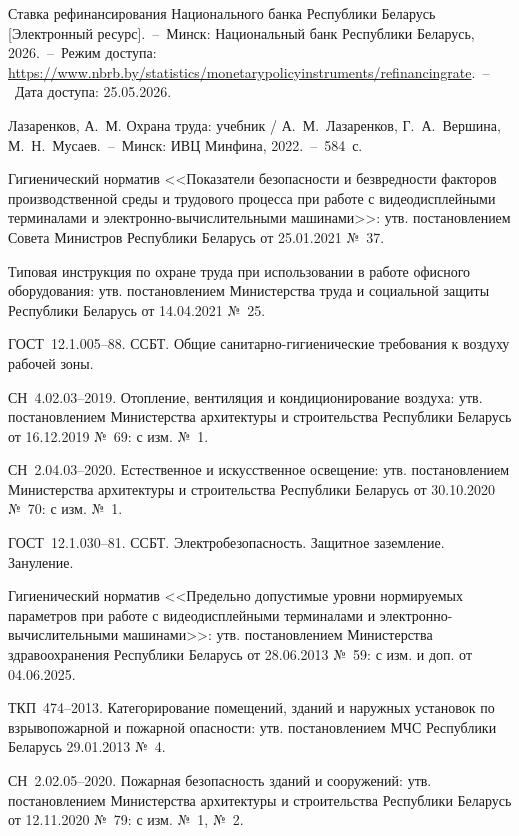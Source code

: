 \begin{enumerate}[label=\arabic*, wide=0pt, labelsep=1ex, nosep]
 Ставка рефинансирования Национального банка Республики Беларусь [Электронный ресурс].~--~Минск: Национальный банк Республики Беларусь, 2026.~--~Режим доступа: \url{https://www.nbrb.by/statistics/monetarypolicyinstruments/refinancingrate}.~--~Дата доступа: 25.05.2026.


\src[lazarenkov] Лазаренков, А.~М. Охрана труда: учебник / А.~М.~Лазаренков, Г.~А.~Вершина, М.~Н.~Мусаев.~--~Минск: ИВЦ Минфина, 2022.~--~584~с.

\src[sanpin2] Гигиенический норматив <<Показатели безопасности и безвредности факторов производственной среды и трудового процесса при работе с видеодисплейными терминалами и электронно-вычислительными машинами>>: утв. постановлением Совета Министров Республики Беларусь от 25.01.2021 №~37.

 Типовая инструкция по охране труда при использовании в работе офисного оборудования: утв. постановлением Министерства труда и социальной защиты Республики Беларусь от 14.04.2021 №~25.

 ГОСТ~12.1.005--88. ССБТ. Общие санитарно-гигиенические требования к воздуху рабочей зоны.

\src[sn-heating] СН~4.02.03--2019. Отопление, вентиляция и кондиционирование воздуха: утв. постановлением Министерства архитектуры и строительства Республики Беларусь от 16.12.2019 №~69: с изм. №~1.

\src[sn-light] СН~2.04.03--2020. Естественное и искусственное освещение: утв. постановлением Министерства архитектуры и строительства Республики Беларусь от 30.10.2020 №~70: с изм. №~1.

 ГОСТ~12.1.030--81. ССБТ. Электробезопасность. Защитное заземление. Зануление.

\src[sanpin1] Гигиенический норматив <<Предельно допустимые уровни нормируемых параметров при работе с видеодисплейными терминалами и электронно-вычислительными машинами>>: утв. постановлением Министерства здравоохранения Республики Беларусь от 28.06.2013 №~59: с изм. и доп. от 04.06.2025.

\src[tkp474] ТКП~474--2013. Категорирование помещений, зданий и наружных установок по взрывопожарной и пожарной опасности: утв. постановлением МЧС Республики Беларусь 29.01.2013 №~4.

\src[sn-fire] СН~2.02.05--2020. Пожарная безопасность зданий и сооружений: утв. постановлением Министерства архитектуры и строительства Республики Беларусь от 12.11.2020 №~79: с изм. №~1, №~2.

\end{enumerate}

